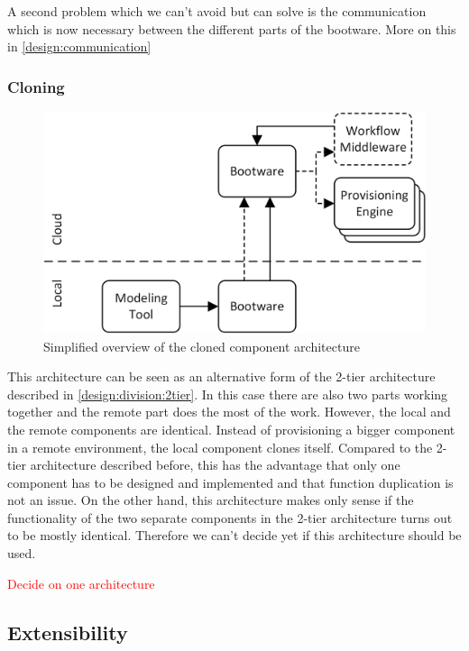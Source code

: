 A second problem which we can't avoid but can solve is the communication which is now necessary between the different parts of the bootware.
More on this in \autoref{design:communication}

\subsubsection{Cloning}

\begin{figure}[!htbp]
	\centering
	\includegraphics[resolution=600]{design/assets/simple_clone}
	\caption{Simplified overview of the cloned component architecture}
	\label{image:single_clone}
\end{figure}

This architecture can be seen as an alternative form of the 2-tier architecture described in \autoref{design:division:2tier}.
In this case there are also two parts working together and the remote part does the most of the work.
However, the local and the remote components are identical.
Instead of provisioning a bigger component in a remote environment, the local component clones itself.
Compared to the 2-tier architecture described before, this has the advantage that only one component has to be designed and implemented and that function duplication is not an issue.
On the other hand, this architecture makes only sense if the functionality of the two separate components in the 2-tier architecture turns out to be mostly identical.
Therefore we can't decide yet if this architecture should be used.

\textcolor{red}{Decide on one architecture}

\subsection{Extensibility}

